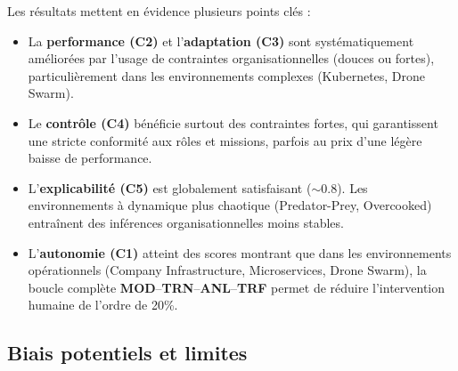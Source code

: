 Les résultats mettent en évidence plusieurs points clés :
\begin{itemize}
  \item La \textbf{performance (C2)} et l'\textbf{adaptation (C3)} sont systématiquement améliorées par l'usage de contraintes organisationnelles (douces ou fortes), particulièrement dans les environnements complexes (Kubernetes, Drone Swarm).
  \item Le \textbf{contrôle (C4)} bénéficie surtout des contraintes fortes, qui garantissent une stricte conformité aux rôles et missions, parfois au prix d'une légère baisse de performance.
  \item L'\textbf{explicabilité (C5)} est globalement satisfaisant ($\sim 0.8$). Les environnements à dynamique plus chaotique (Predator-Prey, Overcooked) entraînent des inférences organisationnelles moins stables.
  \item L'\textbf{autonomie (C1)} atteint des scores montrant que dans les environnements opérationnels (Company Infrastructure, Microservices, Drone Swarm), la boucle complète \textbf{MOD}–\textbf{TRN}–\textbf{ANL}–\textbf{TRF} permet de réduire l'intervention humaine de l'ordre de 20\%.
\end{itemize}

\subsection{Biais potentiels et limites}

